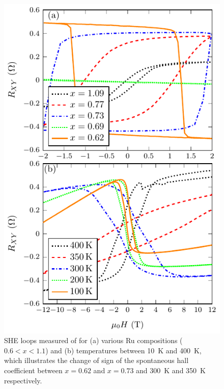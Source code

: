 \documentclass[reprint,aip,apl,floatfix,linenumbers,superscriptaddress]{revtex4-1}
\begin{document}
\begin{figure}
\includegraphics[width=1.0\columnwidth]{Transport-Fig2.pdf}
\caption{SHE loops measured of  for (a) various Ru 
compositions ($0.6<x<1.1$) and (b) temperatures between \SI{10}{\kelvin} and 
\SI{400}{\kelvin}, which illustrates the change of sign of the spontaneous 
hall coefficient between $x=0.62$ and $x=0.73$ and \SI{300}{\kelvin} and \SI{
350}{\kelvin} respectively.}
\label{fig:she}
\end{figure}
\end{document}
